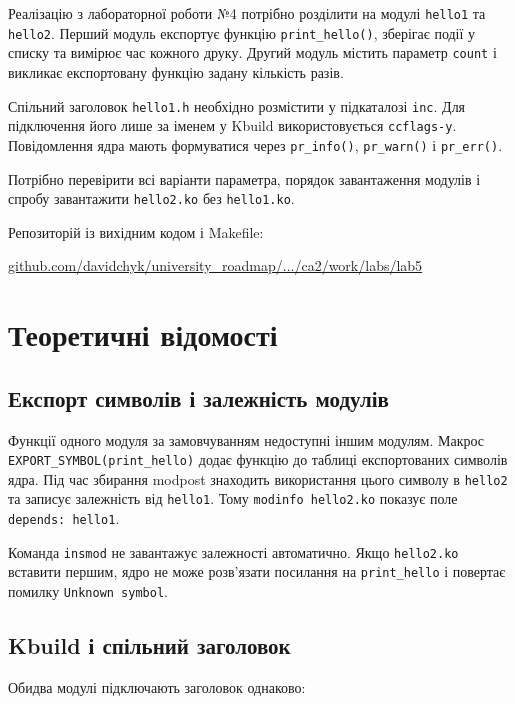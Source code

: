 \documentclass[12pt,a4paper]{article}
\begin{document}
Реалізацію з лабораторної роботи №4 потрібно розділити на модулі
\texttt{hello1} та \texttt{hello2}. Перший модуль експортує функцію
\texttt{print\_hello()}, зберігає події у списку та вимірює час кожного
друку. Другий модуль містить параметр \texttt{count} і викликає експортовану
функцію задану кількість разів.

Спільний заголовок \texttt{hello1.h} необхідно розмістити у підкаталозі
\texttt{inc}. Для підключення його лише за іменем у Kbuild використовується
\texttt{ccflags-y}. Повідомлення ядра мають формуватися через
\texttt{pr\_info()}, \texttt{pr\_warn()} і \texttt{pr\_err()}.

Потрібно перевірити всі варіанти параметра, порядок завантаження модулів і
спробу завантажити \texttt{hello2.ko} без \texttt{hello1.ko}.

Репозиторій із вихідним кодом і Makefile:
\begin{center}
\href{https://github.com/davidchyk/university_roadmap/tree/main/semester5/ca2/work/labs/lab5}{github.com/davidchyk/university\_roadmap/.../ca2/work/labs/lab5}
\end{center}

\section{Теоретичні відомості}

\subsection{Експорт символів і залежність модулів}

Функції одного модуля за замовчуванням недоступні іншим модулям.
Макрос \texttt{EXPORT\_SYMBOL(print\_hello)} додає функцію до таблиці
експортованих символів ядра. Під час збирання modpost знаходить використання
цього символу в \texttt{hello2} та записує залежність від \texttt{hello1}.
Тому \texttt{modinfo hello2.ko} показує поле \texttt{depends: hello1}.

Команда \texttt{insmod} не завантажує залежності автоматично. Якщо
\texttt{hello2.ko} вставити першим, ядро не може розв'язати посилання на
\texttt{print\_hello} і повертає помилку \texttt{Unknown symbol}.

\subsection{Kbuild і спільний заголовок}

Обидва модулі підключають заголовок однаково:
\end{document}
